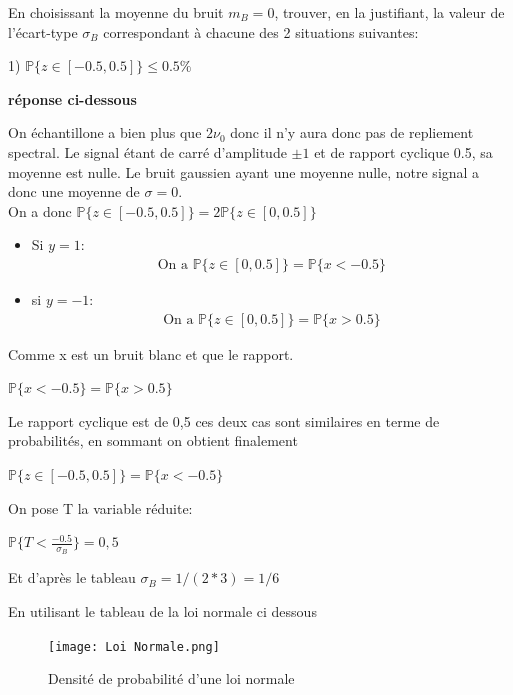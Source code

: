 \documentclass{article}
\newcommand{\debutrep}[1]{\color{blue}\begin{center} \hrulefill \textbf{ #1 } \hrulefill \end{center} }
\begin{document}
En choisissant la moyenne du bruit $m_B=0$, trouver, en la justifiant, la valeur de l'écart-type $\sigma_B$ correspondant à chacune des 2 situations suivantes:
\begin{list}{}{\setlength{\leftmargin}{10mm} \setlength{\labelwidth}{20mm} \setlength{\labelsep}{3mm} \setlength{\itemsep}{1mm} }

\item[1)] $\mathbb{P} \{z \in [-0.5,0.5]\} \leq 0.5 \%$

\debutrep{réponse ci-dessous}
On échantillone a bien plus que $2\nu_0$ donc il n'y aura donc pas de repliement spectral.
Le signal étant de carré d'amplitude $\pm 1$ et de rapport cyclique 0.5, sa moyenne est nulle. Le bruit gaussien ayant une moyenne nulle, notre signal a donc une moyenne de $\sigma=0$.\\
On a donc $\mathbb{P} \{z \in [-0.5,0.5]\} = 2\mathbb{P} \{z \in [0,0.5]\}$

\begin{itemize}
    \item Si $y=1$:
        \[
        \begin{split}
            \text{On a }\mathbb{P} \{z \in [0,0.5]\}=\mathbb{P} \{x<-0.5\}
        \end{split}
        \]
    \item si $y=-1$:
        \[
        \begin{split}
            \text{On a } \mathbb{P} \{z \in [0,0.5]\}=\mathbb{P} \{x>0.5\}
        \end{split}
        \]
\end{itemize}
Comme x est un bruit blanc et que le rapport.

$\mathbb{P} \{x<-0.5\} = \mathbb{P} \{x>0.5\}$

Le rapport cyclique est de 0,5 ces deux cas sont similaires en terme de probabilités, en sommant on obtient finalement

$\mathbb{P} \{z \in [-0.5,0.5]\}=\mathbb{P} \{x<-0.5\}$

On pose T la variable réduite:

$\mathbb{P} \{T<\frac{-0.5}{\sigma_B}\}=0,5$

Et d'après le tableau
$\sigma_B = 1/(2*3) = 1/6$




\newpage
En utilisant le tableau de la loi normale ci dessous

\begin{figure} [H]
    \centering
    \texttt{[image: Loi Normale.png]}
    \caption{Densité de probabilité d'une loi normale}
\end{figure}



\end{list}
\end{document}
